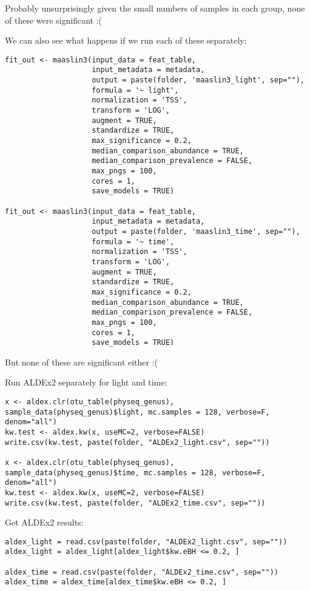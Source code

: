 \documentclass[
]{book}
\begin{document}
Probably unsurprisingly given the small numbers of samples in each group, none of these were significant :(

We can also see what happens if we run each of these separately:

\begin{verbatim}
fit_out <- maaslin3(input_data = feat_table,
                    input_metadata = metadata,
                    output = paste(folder, 'maaslin3_light', sep=""),
                    formula = '~ light',
                    normalization = 'TSS',
                    transform = 'LOG',
                    augment = TRUE,
                    standardize = TRUE,
                    max_significance = 0.2,
                    median_comparison_abundance = TRUE,
                    median_comparison_prevalence = FALSE,
                    max_pngs = 100,
                    cores = 1,
                    save_models = TRUE)

fit_out <- maaslin3(input_data = feat_table,
                    input_metadata = metadata,
                    output = paste(folder, 'maaslin3_time', sep=""),
                    formula = '~ time',
                    normalization = 'TSS',
                    transform = 'LOG',
                    augment = TRUE,
                    standardize = TRUE,
                    max_significance = 0.2,
                    median_comparison_abundance = TRUE,
                    median_comparison_prevalence = FALSE,
                    max_pngs = 100,
                    cores = 1,
                    save_models = TRUE)
\end{verbatim}

But none of these are significant either :(

Run ALDEx2 separately for light and time:

\begin{verbatim}
x <- aldex.clr(otu_table(physeq_genus), sample_data(physeq_genus)$light, mc.samples = 128, verbose=F, denom="all")
kw.test <- aldex.kw(x, useMC=2, verbose=FALSE)
write.csv(kw.test, paste(folder, "ALDEx2_light.csv", sep=""))

x <- aldex.clr(otu_table(physeq_genus), sample_data(physeq_genus)$time, mc.samples = 128, verbose=F, denom="all")
kw.test <- aldex.kw(x, useMC=2, verbose=FALSE)
write.csv(kw.test, paste(folder, "ALDEx2_time.csv", sep=""))
\end{verbatim}

Get ALDEx2 results:

\begin{verbatim}
aldex_light = read.csv(paste(folder, "ALDEx2_light.csv", sep=""))
aldex_light = aldex_light[aldex_light$kw.eBH <= 0.2, ]

aldex_time = read.csv(paste(folder, "ALDEx2_time.csv", sep=""))
aldex_time = aldex_time[aldex_time$kw.eBH <= 0.2, ]
\end{verbatim}
\end{document}

